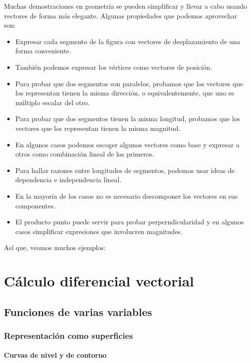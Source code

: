 \documentclass[12pt, fleqn]{report}                             %
\theoremstyle{break}                                            %
\begin{document}
        Muchas demostraciones en geometría se pueden simplificar y llevar a cabo usando vectores de forma más elegante. Algunas propiedades que podemos aprovechar son:
        \begin{itemize}\setlength\itemsep{0em}
        	\item Expresar cada segmento de la figura con vectores de desplazamiento de una forma conveniente.
        	\item También podemos expresar los vértices como vectores de posición.
        	\item Para probar que dos segmentos son paralelos, probamos que los vectores que los representan tienen la misma dirección, o equivalentemente, que uno es múltiplo escalar del otro.
        	\item Para probar que dos segmentos tienen la misma longitud, probamos que los vectores que los representan tienen la misma magnitud.
        	\item En algunos casos podemos escoger algunos vectores como base y expresar a otros como combinación lineal de los primeros.
        	\item Para hallar razones entre longitudes de segmentos, podemos usar ideas de dependencia e independencia lineal.
        	\item En la mayoría de los casos no es necesario descomponer los vectores en sus componentes.
        	\item El producto punto puede servir para probar perperndicularidad y en algunos casos simplificar expresiones que involucren magnitudes.
        \end{itemize}
    
    	Así que, veamos muchos ejemplos:


\part{Cálculo diferencial vectorial}

    \chapter{Funciones de varias variables}
    
        \section{Representación como superficies}
        
            \subsection{Curvas de nivel y de contorno}
            
\end{document}
